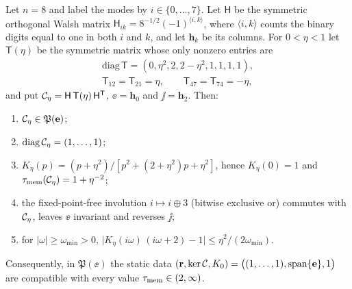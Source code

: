 \begin{theorem}\label{thm:psd}
Let $n=8$ and label the modes by $i\in\{0,\dots,7\}$. Let $\mathsf H$ be the symmetric orthogonal
Walsh matrix $\mathsf H_{ik}=8^{-1/2}(-1)^{\langle i,k\rangle}$, where $\langle i,k\rangle$ counts the
binary digits equal to one in both $i$ and $k$, and let $\mathbf h_k$ be its columns. For $0<\eta<1$ let
$\mathsf T(\eta)$ be the symmetric matrix whose only nonzero entries are
\begin{equation}
\begin{gathered}
\mathrm{diag}\,\mathsf T=(0,\eta^2,2,2-\eta^2,1,1,1,1),\\
\mathsf T_{12}=\mathsf T_{21}=\eta,\qquad \mathsf T_{47}=\mathsf T_{74}=-\eta ,
\end{gathered}
\label{eq:walsh}
\end{equation}
and put $\mathcal C_\eta=\mathsf H\,\mathsf T(\eta)\,\mathsf H^{\mathsf T}$, $\ee=\mathbf h_0$ and $\jj=\mathbf h_2$. Then:
\begin{enumerate}
\item[(i)] $\mathcal C_\eta\in\mathfrak P(\mathbf e)$;
\item[(ii)] $\mathrm{diag}\,\mathcal C_\eta=(1,\dots,1)$;
\item[(iii)] $K_\eta(p)=(p+\eta^2)/[p^2+(2+\eta^2)p+\eta^2]$, hence $K_\eta(0)=1$ and
$\tau_{\rm mem}(\mathcal C_\eta)=1+\eta^{-2}$;
\item[(iv)] the fixed-point-free involution $i\mapsto i\oplus3$ (bitwise exclusive or) commutes with
$\mathcal C_\eta$, leaves $\ee$ invariant and reverses $\jj$;
\item[(v)] for $|\omega|\ge\omega_{\min}>0$, $\big|K_\eta(i\omega)\,(i\omega+2)-1\big|\le\eta^2/(2\omega_{\min})$.
\end{enumerate}
Consequently, in $\mathfrak P(\ee)$ the static data
$(\mathbf r,\ker\mathcal C,K_0)=\big((1,\dots,1),\mathrm{span}\{\mathbf e\},1\big)$ are compatible with every value
$\tau_{\rm mem}\in(2,\infty)$.
\end{theorem}

